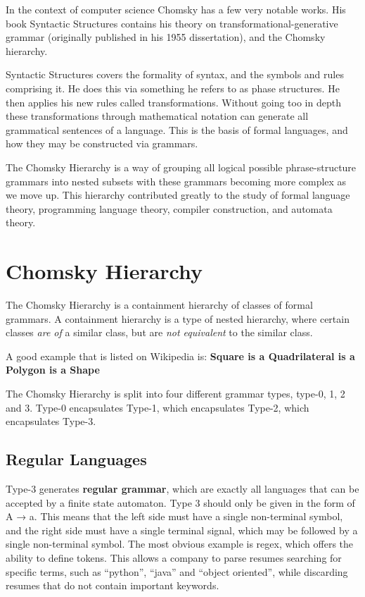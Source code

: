 \documentclass{article}
\begin{document}
In the context of computer science Chomsky has a few very notable works. 
His book Syntactic Structures contains his theory on transformational-generative grammar (originally published in his 1955 dissertation), and the Chomsky hierarchy.
\medskip

Syntactic Structures covers the formality of syntax, and the symbols and rules comprising it. He does this via something he refers to as phase structures. 
He then applies his new rules called transformations. Without going too in depth these transformations through mathematical notation can generate all grammatical sentences of a language. 
This is the basis of formal languages, and how they may be constructed via grammars. 
\medskip

The Chomsky Hierarchy is a way of grouping all logical possible phrase-structure grammars into nested subsets with these grammars becoming more complex as we move up. 
This hierarchy contributed greatly to the study of formal language theory, programming language theory, compiler construction, and automata theory.

\section{Chomsky Hierarchy}  

The Chomsky Hierarchy is a containment hierarchy of classes of formal grammars.
A containment hierarchy is a type of nested hierarchy, where certain classes \textit{are of} a similar class, but are \textit{not equivalent} to the similar class.

A good example that is listed on Wikipedia is:
\textbf{Square is a Quadrilateral is a Polygon is a Shape}

The Chomsky Hierarchy is split into four different grammar types, type-0, 1, 2 and 3.
Type-0 encapsulates Type-1, which encapsulates Type-2, which encapsulates Type-3.

\subsection{Regular Languages} 

Type-3 generates \textbf{regular grammar}, which are exactly all languages that can be accepted by a finite state automaton. Type 3 should only be given in the form of A → a. 
This means that the left side must have a single non-terminal symbol, and the right side must have a single terminal signal, which may be followed by a single non-terminal symbol. 
The most obvious example is regex, which offers the ability to define tokens. This allows a company to parse resumes searching for specific terms, such as “python”, “java” and 
“object oriented”, while discarding resumes that do not contain important keywords.
\end{document}
